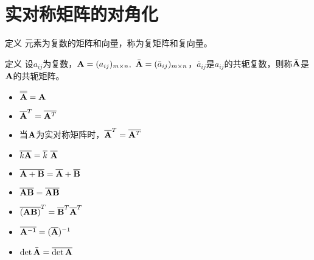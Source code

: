 \section{实对称矩阵的对角化}

\begin{frame}
  \begin{footnotesize}
    \begin{block}{定义}
      元素为复数的矩阵和向量，称为复矩阵和复向量。
    \end{block}

    \begin{block}{定义}
      设$a_{ij}$为复数，$\mathbf{A}=(a_{ij})_{m\times n},~\bar{\mathbf{A}}=(\bar a_{ij})_{m\times n}$，$\bar a_{ij}$是$a_{ij}$的共轭复数，则称$\bar {\mathbf{A}}$是$\mathbf{A}$的共轭矩阵。
    \end{block}


    \begin{itemize}
    \item $\overline {\overline {\mathbf{A}}} = \mathbf{A}$
    \item ${\overline {\mathbf{A}}}^T = \overline{\mathbf{A}^T}$
    \item 当$\mathbf{A}$为实对称矩阵时，${\overline {\mathbf{A}}}^T = \overline{\mathbf{A}^T}$
    \end{itemize}
  \end{footnotesize}
\end{frame}

\begin{frame}
  \begin{footnotesize}
    \begin{itemize}
    \item $\overline{k\mathbf{A}}=\overline k ~\overline {\mathbf{A}}$
    \item $\overline{\mathbf{A}+\mathbf{B}}=\overline {\mathbf{A}}+\overline {\mathbf{B}}$
    \item $\overline{\mathbf{A}\mathbf{B}}=\overline {\mathbf{A}}\overline {\mathbf{B}}$
    \item $\overline{(\mathbf{A}\mathbf{B})}^T=\overline {\mathbf{B}}^T \overline {\mathbf{A}}^T$
    \item $\overline{\mathbf{A}^{-1}}=(\overline {\mathbf{A}})^{-1}$
    \item $\det \bar{\mathbf{A}} = \overline{\det \mathbf{A}}$
    \end{itemize}
  \end{footnotesize}
\end{frame}


